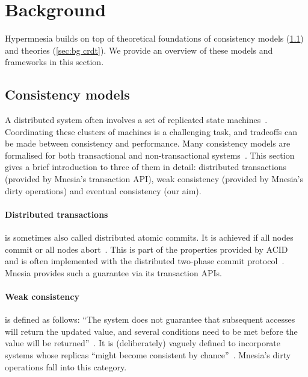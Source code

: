 \section{Background} \label{sec:bg}

Hypermnesia builds on top of theoretical foundations of consistency models
(\cref{sec:bg consistency models}) and  theories (\cref{sec:bg crdt}). 
We provide an overview of these models and frameworks in this section.


\subsection{Consistency models} \label{sec:bg consistency models}

A distributed system often involves a set of replicated state 
machines~\cite{lamport1978clock}. Coordinating these clusters of machines is a 
challenging task, and tradeoffs can be
made between consistency and performance. Many consistency models are formalised for 
both transactional and non-transactional systems~\cite{viotti2016consistency}. 
This section gives a brief
introduction to three of them in detail: distributed transactions (provided by
Mnesia's transaction API), weak consistency (provided by Mnesia's dirty operations)
and eventual consistency (our aim).

\paragraph{Distributed transactions} is sometimes also called distributed atomic 
commits. It is achieved if all nodes commit
or all nodes abort~\cite{saltzer2009Principles}. This is part of the properties provided by 
ACID~\cite{haerder1983dbtransaction} and
is often implemented with the distributed two-phase commit protocol~\cite{bernstein1987concurrency}.
Mnesia provides such a guarantee via its transaction APIs.

\paragraph{Weak consistency}
is defined as follows:  
``The system does not guarantee that subsequent accesses will return the updated 
value, and several conditions need to be met before the value will be 
returned''~\cite{vogels2008ec,bermbach2013consistency,viotti2016consistency}.
It is (deliberately) vaguely defined to incorporate systems whose replicas
``might become consistent by chance''~\cite{bermbach2013consistency}. 
Mnesia's dirty operations fall into this category. 

